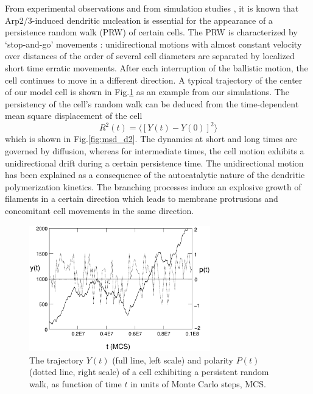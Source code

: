 \documentclass[aps,preprint,pre,array,epsfig,eqsecnum]{revtex4}
\begin{document}
From experimental observations \cite{Bray92,Lauffenburger96,Shreiber03} and
from simulation studies \cite{Sambeth01a,Satya04}, it is known that
Arp2/3-induced dendritic nucleation is essential for the appearance of
a persistence random walk (PRW) of certain cells. 
%
The PRW is characterized by `stop-and-go' movements :
unidirectional motions with almost constant velocity
over distances of the
order of several cell diameters are separated by localized short time
erratic movements. After each interruption of the ballistic motion, the
cell continues to move in a different direction. 
%
A typical trajectory of the center of our model cell is
shown in Fig.\ref{fig:prw_d1} as an example from our simulations.
%
The persistency of the cell's random walk can be deduced 
from the time-dependent mean square displacement of the cell 
%
\begin{equation}
     R^2(t) = \langle [Y(t) - Y(0)]^2 \rangle
\end{equation}
%
which is shown in Fig.\ref{fig:msd_d2}. 
The dynamics at short and long times are 
governed by diffusion, whereas for intermediate times, 
the cell motion exhibits a unidirectional drift during a certain
persistence time.
%
The unidirectional motion has been explained as a consequence of 
the autocatalytic nature \cite{Carlier00,Sambeth01a} of 
the dendritic polymerization kinetics. 
The branching processes induce
an explosive growth of filaments in a certain direction which 
leads to membrane protrusions and concomitant cell movements in the
same direction.
%
\begin{figure}[h] %
  \begin{center}
    \includegraphics[width=0.70\textwidth,angle=0]
{Nandy2.eps}    
    \caption{The trajectory $Y(t)$ (full line, left scale) 
    and polarity $P(t)$ (dotted line, right scale)
    of a cell exhibiting a persistent random walk, as function
    of time $t$ in units of Monte Carlo steps, MCS. } 
    \label{fig:prw_d1}
  \end{center}
\end{figure}
\end{document}
